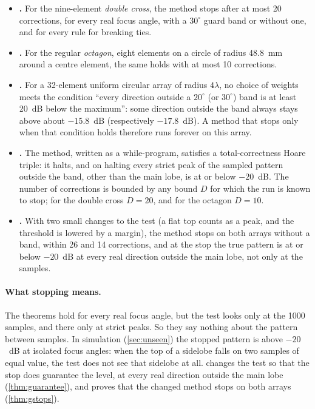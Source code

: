 \documentclass[11pt]{amsart}
\theoremstyle{plain}
\theoremstyle{definition}
\begin{document}
\begin{itemize}
\item \textbf{.}  For the nine-element \emph{double cross}, the method stops after at
most 20 corrections, for every real focus angle, with a $30^\circ$ guard band or without one, and
for every rule for breaking ties.
\item \textbf{.}  For the regular \emph{octagon}, eight elements on a circle of radius
48.8~mm around a centre element, the same holds with at most 10 corrections.
\item \textbf{.}  For a 32-element uniform circular array of radius $4\lambda$, no
choice of weights meets the condition ``every direction outside a $20^\circ$ (or $30^\circ$) band
is at least 20~dB below the maximum'': some direction outside the band always stays above about
$-15.8$~dB (respectively $-17.8$~dB).  A method that stops only when that condition holds therefore
runs forever on this array.
\item \textbf{.}  The method, written as a while-program, satisfies a
total-correctness Hoare triple: it halts, and on halting every strict peak of the sampled pattern outside
the band, other than the main lobe, is at or below $-20$~dB.  The number of corrections is bounded by any bound $D$ for which the run is known to
stop; for the double cross $D = 20$, and for the octagon $D = 10$.
\item \textbf{.}  With two small changes to the test (a flat top
counts as a peak, and the threshold is lowered by a margin), the method stops on both arrays without a
band, within 26 and 14 corrections, and at the stop the true pattern is at or below $-20$~dB at every
real direction outside the main lobe, not only at the samples.
\end{itemize}

\paragraph{What stopping means.}  The theorems hold for every real focus angle, but the test looks
only at the 1000 samples, and there only at strict peaks.  So they say nothing about the pattern
between samples.  In simulation (\cref{sec:unseen}) the stopped pattern is above $-20$~dB at isolated
focus angles: when the top of a sidelobe falls on two samples of equal value, the test does not see
that sidelobe at all.   changes the test so that the stop does guarantee the level,
at every real direction outside the main lobe (\cref{thm:guarantee}), and proves that the changed
method stops on both arrays (\cref{thm:gstops}).
\end{document}
